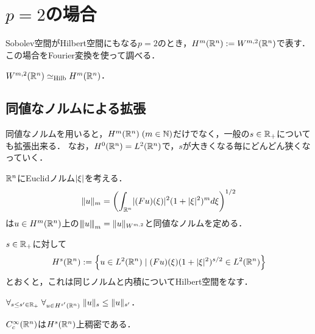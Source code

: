 \documentclass[uplatex,dvipdfmx]{jsreport}
\begin{document}
\section{$p=2$の場合}

\begin{tcolorbox}[colframe=ForestGreen, colback=ForestGreen!10!white,breakable,colbacktitle=ForestGreen!40!white,coltitle=black,fonttitle=\bfseries\sffamily,
title=]
    Sobolev空間がHilbert空間にもなる$p=2$のとき，$H^m(\mathbb{R}^n):=W^{m,2}(\mathbb{R}^n)$で表す．
    この場合をFourier変換を使って調べる．
\end{tcolorbox}

\begin{theorem}\label{thm-Hilbert-Sobolev-space}
    $W^{m,2}(\mathbb{R}^n)\simeq_{\mathrm{Hilb}} H^m(\mathbb{R}^n)$．
\end{theorem}

\subsection{同値なノルムによる拡張}

\begin{tcolorbox}[colframe=ForestGreen, colback=ForestGreen!10!white,breakable,colbacktitle=ForestGreen!40!white,coltitle=black,fonttitle=\bfseries\sffamily,
title=]
    同値なノルムを用いると，$H^m(\mathbb{R}^n)\;(m\in\mathbb{N})$だけでなく，一般の$s\in\mathbb{R}_+$についても拡張出来る．
    なお，$H^0(\mathbb{R}^n)=L^2(\mathbb{R}^n)$で，$s$が大きくなる毎にどんどん狭くなっていく．
\end{tcolorbox}

\begin{proposition}[同値なノルム]
    $\mathbb{R}^n$にEuclidノルム$\lvert\xi\rvert$を考える．
    \[\|u\|_m=\left(\int_{\mathbb{R}^n}\lvert(Fu)(\xi)\rvert^2(1+\lvert\xi\rvert^2)^md\xi\right)^{1/2}\]
    は$u\in H^m(\mathbb{R}^n)$上の${\left\vert\kern-0.25ex\left\vert\kern-0.25ex\left\vert u \right\vert\kern-0.25ex\right\vert\kern-0.25ex\right\vert}_m=\|u\|_{W^{m,2}}$と同値なノルムを定める．
\end{proposition}

\begin{proposition}
    $s\in\mathbb{R}_+$に対して
    \[H^s(\mathbb{R}^n):=\left\{u\in L^2(\mathbb{R}^n)\mid(Fu)(\xi)(1+\lvert\xi\rvert^2)^{s/2}\in L^2(\mathbb{R}^n)\right\}\]
    とおくと，これは同じノルムと内積についてHilbert空間をなす．
\end{proposition}

\begin{lemma}
    $\forall_{s\le s'\in\mathbb{R}_+}\;\forall_{u\in H^{s'}(\mathbb{R}^n)}\;\|u\|_s\le\|u\|_{s'}$．
\end{lemma}

\begin{theorem}
    $C_c^\infty(\mathbb{R}^n)$は$H^s(\mathbb{R}^n)$上稠密である．
\end{theorem}
\end{document}
